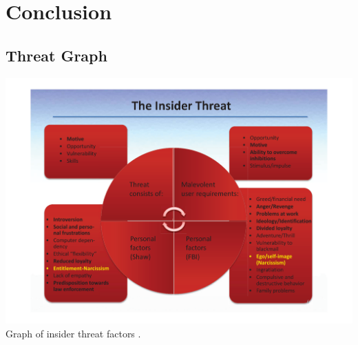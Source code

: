 \documentclass[12pt]{article}
\begin{document}
\newpage
\section{Conclusion}

\newpage


\newpage
\begin{appendices}
\section{Threat Graph}
\label{appendix:threatgraph}
\includegraphics[width=\linewidth]{res/threat_graph.png}
Graph of insider threat factors \citep{behaviourdetection}.


\end{appendices}
\end{document}
